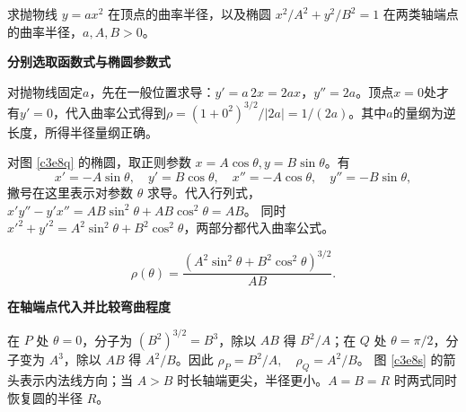 \begin{question}
\begin{example}[抛物线与椭圆的曲率]
求抛物线 $y=ax^2$ 在顶点的曲率半径，以及椭圆 $x^2/A^2+y^2/B^2=1$ 在两类轴端点的曲率半径，$a,A,B>0$。
\end{example}
\end{question}
\begin{solution}\textbf{分别选取函数式与椭圆参数式}\par\nobreak
对抛物线固定$a$，先在一般位置求导：$y'=a\,2x=2ax$，$y''=2a$。顶点$x=0$处才有$y'=0$，代入曲率公式得到$\rho=(1+0^2)^{3/2}/|2a|=1/(2a)$。其中$a$的量纲为逆长度，所得半径量纲正确。

对图 \ref{c3e8q} 的椭圆，取正则参数 $x=A\cos\theta,y=B\sin\theta$。有
\[
 x'=-A\sin\theta,\quad y'=B\cos\theta,\quad
 x''=-A\cos\theta,\quad y''=-B\sin\theta,
\]
撇号在这里表示对参数 $\theta$ 求导。代入行列式，
$x'y''-y'x''=AB\sin^2\theta+AB\cos^2\theta=AB$。
同时 $x'^2+y'^2=A^2\sin^2\theta+B^2\cos^2\theta$，两部分都代入曲率公式。

\[
 \rho(\theta)=
 \frac{(A^2\sin^2\theta+B^2\cos^2\theta)^{3/2}}{AB}.
\]


\par\medskip{}\noindent\textbf{在轴端点代入并比较弯曲程度}\par\nobreak
在 $P$ 处 $\theta=0$，分子为 $(B^2)^{3/2}=B^3$，除以 $AB$ 得 $B^2/A$；在 $Q$ 处 $\theta=\pi/2$，分子变为 $A^3$，除以 $AB$ 得 $A^2/B$。因此
$\boxed{\rho_P=B^2/A,\quad \rho_Q=A^2/B}$。
图 \ref{c3e8s} 的箭头表示内法线方向；当 $A>B$ 时长轴端更尖，半径更小。$A=B=R$ 时两式同时恢复圆的半径 $R$。



\end{solution}
